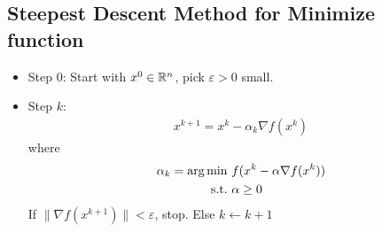 \documentclass[11pt]{article}
\numberwithin{equation}{section}
\begin{document}
\subsection{Steepest Descent Method for Minimize function}
\begin{itemize}
    \item Step 0: Start with $x^0 \in \mathbb R^n$, pick $\varepsilon > 0$ small.
    \item Step $k$: \begin{align*}
        x^{k+1}=x^{k}- \alpha_{k} \nabla f \left(x^{k}\right)
    \end{align*}
    where \begin{align*}
        \alpha_k = \arg \min \ & f(x^k -\alpha \nabla f(x^k)) \\
        \text{s.t.} \ & \alpha \geq 0
    \end{align*}
    If $\| \nabla f(x^{k+1})\|<\varepsilon$, stop. Else $k \leftarrow k+1$
\end{itemize}
\end{document}
